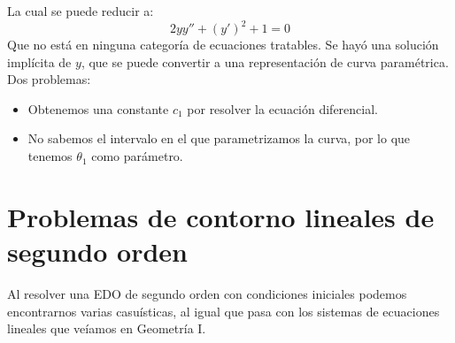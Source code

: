 La cual se puede reducir a:
\begin{equation*}
    2yy'' + {(y')}^{2} + 1 = 0
\end{equation*}
Que no está en ninguna categoría de ecuaciones tratables. Se hayó una solución implícita de $y$, que se puede convertir a una representación de curva paramétrica. Dos problemas:
\begin{itemize}
    \item Obtenemos una constante $c_1$ por resolver la ecuación diferencial.
    \item No sabemos el intervalo en el que parametrizamos la curva, por lo que tenemos $\theta_1$ como parámetro.
\end{itemize}


\section{Problemas de contorno lineales de segundo orden}
\noindent
Al resolver una EDO de segundo orden con condiciones iniciales podemos encontrarnos varias casuísticas, al igual que pasa con los sistemas de ecuaciones lineales que veíamos en Geometría I.

